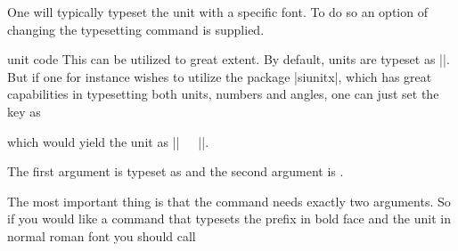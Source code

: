One will typically typeset the unit with a specific font. To do so an option of changing the typesetting command is supplied.
\begin{pgfplotscodetwokey}{unit code}%
  This can be utilized to great extent. By default, units are typeset as ||. But if one for instance
  wishes to utilize the package |siunitx|, which has great capabilities in typesetting both units, numbers and angles, one can just set the key as
\begin{codeexample}
\end{codeexample}
  which would yield the unit as |\si{||}|.

  The first argument is typeset as  and the second argument is .

  The most important thing is that the command needs exactly two arguments. So if you would like a command that typesets the prefix in bold face and the
  unit in normal roman font you should call
\begin{codeexample}[code only]
\pgfplotsset{unit code/.code 2 args={\mathbf{#1}\mathrm{#2}}
\end{codeexample}
\end{pgfplotscodetwokey}


